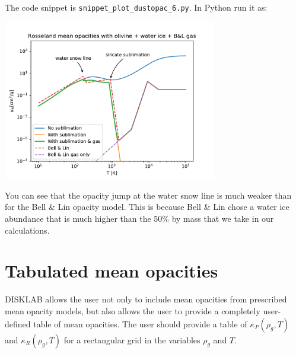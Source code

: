 \documentclass{book}
\newcommand{\code}[1]{{\small\tt #1}}
\begin{document}
The code snippet is
\code{snippet\_plot\_dustopac\_6.py}. In Python run it as:
\begin{codebox}
\end{codebox}
\centerline{\includegraphics[width=0.7\textwidth]{../snippets/fig_snippet_plot_dustopac_6_1.pdf}}

You can see that the opacity jump at the water snow line is much weaker than
for the Bell \& Lin opacity model. This is because Bell \& Lin chose
a water ice abundance that is much higher than the 50\% by mass that
we take in our calculations.


\section{Tabulated mean opacities}
\label{sec-mean-opac-tabulated}
%
{\sf DISKLAB} allows the user not only to include mean opacities from prescribed
mean opacity models, but also allows the user to provide a completely
user-defined table of mean opacities. The user should provide a table of
$\kappa_P(\rho_{g},T)$ and $\kappa_R(\rho_{g},T)$ for a rectangular grid in the
variables $\rho_g$ and $T$.
\end{document}
